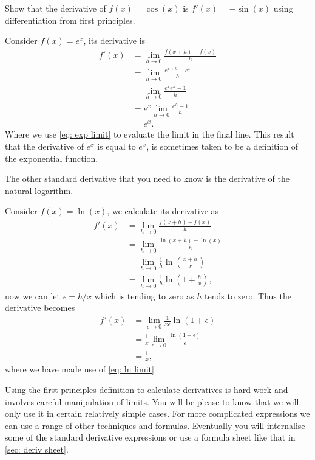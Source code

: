 \begin{exercise}
Show that the derivative of $f(x)=\cos(x)$ is $f'(x)=-\sin(x)$ using differentiation from first principles.
\end{exercise}

\begin{ex}
Consider $f(x)=e^{x}$, its derivative is
\begin{align*}
f'(x)	&=\lim_{h\to 0}\frac{f(x+h)-f(x)}{h}\\
	&=\lim_{h\to 0}\frac{e^{x+h}-e^{x}}{h}\\
	&=\lim_{h\to 0}\frac{e^{x}e^{h}-1}{h}\\
	&=e^{x}\lim_{h\to 0}\frac{e^{h}-1}{h}\\
	&=e^{x}.
\end{align*}
Where we use \cref{eq: exp limit} to evaluate the limit in the final line. This result that the derivative of $e^{x}$ is equal to $e^{x}$, is sometimes taken to be a definition of the exponential function. 
\end{ex}

The other standard derivative that you need to know is the derivative of the natural logarithm.
\begin{ex}
Consider $f(x)=\ln(x)$, we calculate its derivative as
\begin{align*}
f'(x)	&=\lim_{h\to 0}\frac{f(x+h)-f(x)}{h}\\
	&=\lim_{h\to 0}\frac{\ln(x+h)-\ln(x)}{h}\\
	&=\lim_{h\to 0}\frac{1}{h}\ln\left(\frac{x+h}{x}\right)\\
	&=\lim_{h\to 0}\frac{1}{h}\ln\left(1+\frac{h}{x}\right),
\end{align*}
now we can let  $\epsilon =h/x$ which is tending to zero as $h$ tends to zero. Thus the derivative becomes
\begin{align*}
f'(x)	&=\lim_{\epsilon\to 0}\frac{1}{x\epsilon}\ln\left(1+\epsilon\right)\\
	&=\frac{1}{x}\lim_{\epsilon\to 0}\frac{\ln\left(1+\epsilon\right)}{\epsilon}\\
	&=\frac{1}{x},
\end{align*}
where we have made use of \cref{eq: ln limit}
\end{ex}

Using the first principles definition to calculate derivatives is hard work and involves careful manipulation of limits. You will be please to know that we will only use it in certain relatively simple cases. For more complicated expressions we can use a range of other techniques and formulas. Eventually you will internalise some of the standard derivative expressions or use a formula sheet like that in \cref{sec: deriv sheet}.

